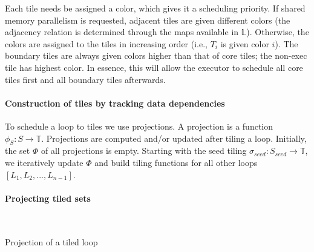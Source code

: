 Each tile needs be assigned a color, which gives it a scheduling priority. If shared memory parallelism is requested, adjacent tiles are given different colors (the adjacency relation is determined through the maps available in $\mathbb{L}$). Otherwise, the colors are assigned to the tiles in increasing order (i.e., $T_i$ is given color $i$). The boundary tiles are always given colors higher than that of core tiles; the non-exec tile has highest color. In essence, this will allow the executor to schedule all core tiles first and all boundary tiles afterwards. 

\paragraph{Construction of tiles by tracking data dependencies}
To schedule a loop to tiles we use projections. A projection is a function $\phi_S : S \rightarrow \mathbb{T}$. Projections are computed and/or updated after tiling a loop. Initially, the set $\Phi$ of all projections is empty. Starting with the seed tiling $\sigma_{seed} : S_{seed} \rightarrow \mathbb{T}$, we iteratively update $\Phi$ and build tiling functions for all other loops $[L_1, L_2, ..., L_{n-1}]$. 

\paragraph{Projecting tiled sets}

\begin{algorithm}[t]
\nonl ~\\
\caption{Projection of a tiled loop}
\label{algo:st-projection}
\end{algorithm}

